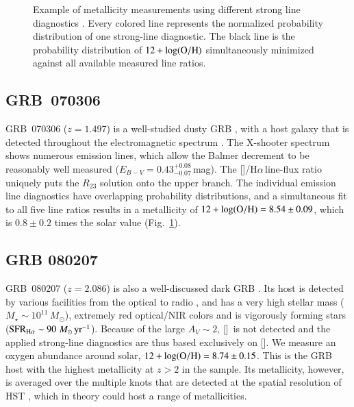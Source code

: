 \documentclass[traditabstract, longauth]{aa}
\newcommand{\ha}{H$\alpha$}
\newcommand{\oh}{12+\log(\rm{O/H})}
\newcommand{\oii}{[\ion{O}{ii}]}
\newcommand{\nii}{[\ion{N}{ii}]}
\newcommand{\Msun}{$M_\odot$}
\newcommand{\Msunyr}{$M_\odot\,\rm{yr}^{-1}$}
\begin{document}
\begin{appendix}
\begin{figure}
\begin{subfigure}{.33\textwidth}
\end{subfigure}
\caption{Example of metallicity measurements using different strong line diagnostics \citep{2006A&A...459...85N, 2008A&A...488..463M}. Every colored line represents the normalized probability distribution of one strong-line diagnostic. The black line is the probability distribution of $\oh$ simultaneously minimized against all available measured line ratios.}
\label{fig:zexamples}
\end{figure}

\subsection{GRB~070306} GRB~070306 ($z=1.497$) is a well-studied dusty GRB \citep{2008ApJ...681..453J}, with a host galaxy that is detected throughout the electromagnetic spectrum \citep{2014A&A...565A.112H, 2014arXiv1408.5076S, 2015ApJ...801..102P}. The X-shooter spectrum shows numerous emission lines, which allow the Balmer decrement to be reasonably well measured ($E_{B-V} = 0.43_{-0.07}^{+0.08}$\,mag). The \nii/\ha\,line-flux ratio uniquely puts the $R_{23}$ solution onto the upper branch. The individual emission line diagnostics have overlapping probability distributions, and a simultaneous fit to all five line ratios results in a metallicity of $\oh=8.54\pm0.09$, which is $0.8\pm0.2$ times the solar value (Fig.~\ref{fig:zexamples}).

\subsection{GRB 080207} GRB~080207 ($z=2.086$) is also a well-discussed dark GRB \citep{2011ApJ...736L..36H, 2012MNRAS.421...25S}. Its host is detected by various facilities from the optical to radio \citep{2012A&A...545A..77R, 2013ApJ...778..128P}, and has a very high stellar mass ($M_{\star}\sim10^{11}$\,\Msun), extremely red optical/NIR colors and is vigorously forming stars ($\rm{SFR}_{\rm{H\alpha}}\sim 90\,$\Msunyr). Because of the large $A_V\sim2$, \oii\, is not detected and the applied strong-line diagnostics are thus based exclusively on \nii. We measure an oxygen abundance around solar, $\oh = 8.74\pm0.15$. This is the GRB host with the highest metallicity at $z>2$ in the sample. Its metallicity, however, is averaged over the multiple knots that are detected at the spatial resolution of HST \citep{2012MNRAS.421...25S}, which in theory could host a range of metallicities. 


\end{appendix}
\end{document}
